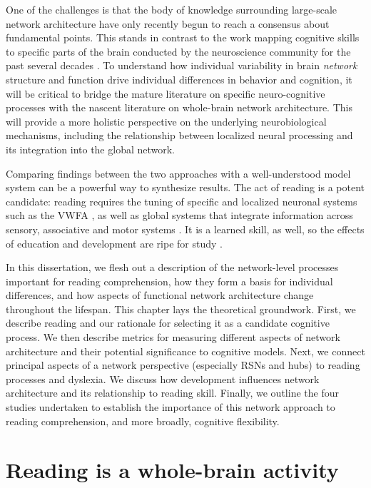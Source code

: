 One of the challenges is that the body of knowledge surrounding large-scale network architecture have only recently begun to reach a consensus about fundamental points. This stands in contrast to the work mapping cognitive skills to specific parts of the brain conducted by the neuroscience community for the past several decades \citep{Yarkoni2011}. To understand how individual variability in brain \textit{network} structure and function drive individual differences in behavior and cognition, it will be critical to bridge the mature literature on specific neuro-cognitive processes with the nascent literature on whole-brain network architecture. This will provide a more holistic perspective on the underlying neurobiological mechanisms, including the relationship between localized neural processing and its integration into the global network. 

Comparing findings between the two approaches with a well-understood model system can be a powerful way to synthesize results. The act of reading is a potent candidate: reading requires the tuning of specific and localized neuronal systems such as the VWFA \citep{McCandliss2003}, as well as global systems that integrate information across sensory, associative and motor systems \citep{Price2012}. It is a learned skill, as well, so the effects of education and development are ripe for study \citep{Saygin2016}. 

In this dissertation, we flesh out a description of the network-level processes important for reading comprehension, how they form a basis for individual differences, and how aspects of functional network architecture change throughout the lifespan. This chapter lays the theoretical groundwork. First, we describe reading and our rationale for selecting it as a candidate cognitive process. We then describe metrics for measuring different aspects of network architecture and their potential significance to cognitive models. Next, we connect principal aspects of a network perspective (especially RSNs and hubs) to reading processes and dyslexia. We discuss how development influences network architecture and its relationship to reading skill. Finally, we outline the four studies undertaken to establish the importance of this network approach to reading comprehension, and more broadly, cognitive flexibility.

\section{Reading is a whole-brain activity}

